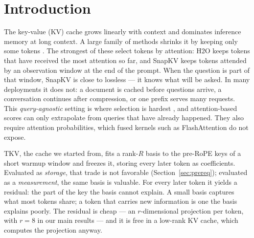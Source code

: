 \documentclass{article}
\begin{document}
\section{Introduction}
\label{sec:intro}

The key-value (KV) cache grows linearly with context and dominates inference
memory at long context. A large family of methods shrinks it by keeping only
some tokens \citep{streamingllm2023,h2o2023,snapkv2024,pyramidkv2024}. The
strongest of these select tokens by attention: H2O \citep{h2o2023} keeps tokens
that have received the most attention so far, and SnapKV \citep{snapkv2024}
keeps tokens attended by an observation window at the end of the prompt.
When the question is part of that window, SnapKV is close to lossless ---
it knows what will be asked. In many deployments it does not: a document is
cached before questions arrive, a conversation continues after compression,
or one prefix serves many requests. This \emph{query-agnostic} setting is
where selection is hardest \citep{kvzip2025}, and attention-based scores can
only extrapolate from queries that have already happened. They also require
attention probabilities, which fused kernels such as FlashAttention do not
expose.

TKV, the cache we started from, fits a rank-$R$ basis to the pre-RoPE keys of
a short warmup window and freezes it, storing every later token as
coefficients. Evaluated as \emph{storage}, that trade is not favorable
(Section~\ref{sec:prereq}); evaluated as a \emph{measurement}, the same basis
is valuable. For every later token it yields a residual: the part of the key
the basis cannot explain. A small basis captures what most
tokens share; a token that carries new information is one the basis explains
poorly. The residual is cheap --- an $r$-dimensional projection per token,
with $r{=}8$ in our main results --- and it is free in a low-rank KV cache,
which computes the projection anyway.
\end{document}
